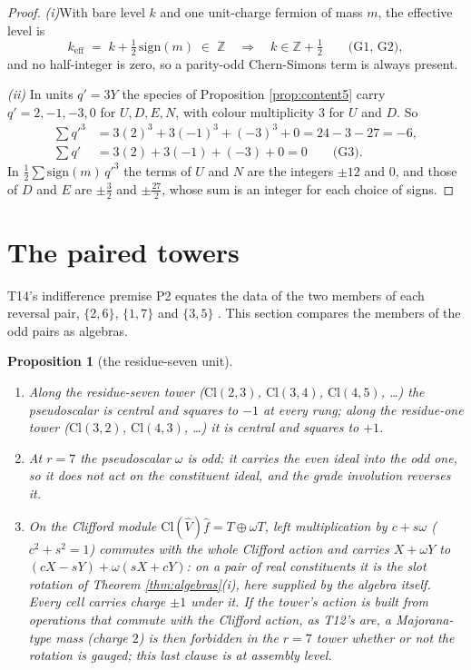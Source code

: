 \documentclass[11pt]{article}
\newtheorem{proposition}[theorem]{Proposition}
\theoremstyle{definition}
\newcommand{\Cl}{\mathrm{Cl}}
\newcommand{\hatV}{\widehat{V}}
\newcommand{\hf}{\hat{f}}
\newcommand{\pitem}[1]{\par\smallskip\noindent\textit{#1}\enspace}
\begin{document}
\begin{proof}
\textit{(i)}\enspace With bare level $k$ and one unit-charge fermion of mass $m$, the effective level is
\[
k_{\mathrm{eff}} \;=\; k + \tfrac{1}{2}\,\mathrm{sign}(m) \;\in\; \mathbb{Z} \quad\Longrightarrow\quad k \in \mathbb{Z} + \tfrac{1}{2} \qquad \text{(G1, G2)},
\]
and no half-integer is zero, so a parity-odd Chern-Simons term is always present.

\pitem{(ii)} In units $q' = 3Y$ the species of Proposition \ref{prop:content5} carry $q' = 2, -1, -3, 0$ for $U, D, E, N$, with colour multiplicity $3$ for $U$ and $D$. So
\begin{align*}
\sum q'^{3} &= 3(2)^{3} + 3(-1)^{3} + (-3)^{3} + 0 = 24 - 3 - 27 = -6, \\
\sum q' &= 3(2) + 3(-1) + (-3) + 0 = 0 \qquad \text{(G3)}.
\end{align*}
In $\tfrac{1}{2}\sum \mathrm{sign}(m)\,q'^{3}$ the terms of $U$ and $N$ are the integers $\pm 12$ and $0$, and those of $D$ and $E$ are $\pm\tfrac{3}{2}$ and $\pm\tfrac{27}{2}$, whose sum is an integer for each choice of signs.
\end{proof}

\section{The paired towers}\label{sec:paired}

T14's indifference premise P2 equates the data of the two members of each reversal pair, $\{2, 6\}$, $\{1, 7\}$ and $\{3, 5\}$ \cite[Prem.~2.2]{ButlerT14}. This section compares the members of the odd pairs as algebras.

\begin{proposition}[the residue-seven unit]\label{prop:omega7}
\begin{enumerate}
\item[(i)] Along the residue-seven tower ($\Cl(2,3)$, $\Cl(3,4)$, $\Cl(4,5)$, \ldots) the pseudoscalar is central and squares to $-1$ at every rung; along the residue-one tower ($\Cl(3,2)$, $\Cl(4,3)$, \ldots) it is central and squares to $+1$.
\item[(ii)] At $r = 7$ the pseudoscalar $\omega$ is odd: it carries the even ideal into the odd one, so it does not act on the constituent ideal, and the grade involution reverses it.
\item[(iii)] On the Clifford module $\Cl(\hatV)\hf = T \oplus \omega T$, left multiplication by $c + s\omega$ ($c^{2} + s^{2} = 1$) commutes with the whole Clifford action and carries $X + \omega Y$ to $(cX - sY) + \omega(sX + cY)$: on a pair of real constituents it is the slot rotation of Theorem \ref{thm:algebras}(i), here supplied by the algebra itself. Every cell carries charge $\pm 1$ under it. If the tower's action is built from operations that commute with the Clifford action, as T12's are, a Majorana-type mass (charge $2$) is then forbidden in the $r = 7$ tower whether or not the rotation is gauged; this last clause is at assembly level.
\end{enumerate}
\end{proposition}
\end{document}
